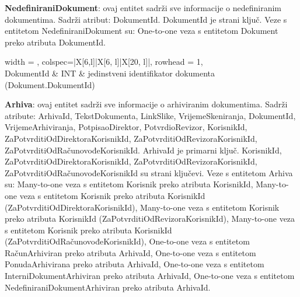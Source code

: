 				\textbf{NedefiniraniDokument}: ovaj entitet sadrži sve informacije o nedefiniranim dokumentima. Sadrži atribut: DokumentId. DokumentId je strani ključ.
				Veze s entitetom NedefiniraniDokument su: One-to-one veza s entitetom Dokument preko atributa DokumentId.
				
				
				\begin{longtblr}[
					label=none,
					entry=none
					]{
						width = \textwidth,
						colspec={|X[6,l]|X[6, l]|X[20, l]|}, 
						rowhead = 1,
					} %
					\hline {}	 \\ \hline[3pt]
					DokumentId & INT	&  	jedinstveni identifikator dokumenta (Dokument.DokumentId)  	\\ \hline
				\end{longtblr}

				\textbf{Arhiva}: ovaj entitet sadrži sve informacije o arhiviranim dokumentima. Sadrži atribute: ArhivaId, TekstDokumenta, LinkSlike, VrijemeSkeniranja, DokumentId, VrijemeArhiviranja, PotpisaoDirektor, PotvrdioRevizor, KorisnikId, ZaPotvrditiOdDirektoraKorisnikId, ZaPotvrditiOdRevizoraKorisnikId, ZaPotvrditiOdRačunovođeKorisnikId. ArhivaId je primarni ključ. KorisnikId, ZaPotvrditiOdDirektoraKorisnikId, ZaPotvrditiOdRevizoraKorisnikId, ZaPotvrditiOdRačunovođeKorisnikId su strani ključevi.
				Veze s entitetom Arhiva su: Many-to-one veza s entitetom Korisnik preko atributa KorisnikId,
				Many-to-one veza s entitetom Korisnik preko atributa KorisnikId (ZaPotvrditiOdDirektoraKorisnikId),
				Many-to-one veza s entitetom Korisnik preko atributa KorisnikId (ZaPotvrditiOdRevizoraKorisnikId),
				Many-to-one veza s entitetom Korisnik preko atributa KorisnikId (ZaPotvrditiOdRačunovođeKorisnikId),
				One-to-one veza s entitetom RačunArhiviran preko atributa ArhivaId,
				One-to-one veza s entitetom PonudaArhivirana preko atributa ArhivaId,
				One-to-one veza s entitetom InterniDokumentArhiviran preko atributa ArhivaId,
				One-to-one veza s entitetom NedefiniraniDokumentArhiviran preko atributa ArhivaId.

				
				
